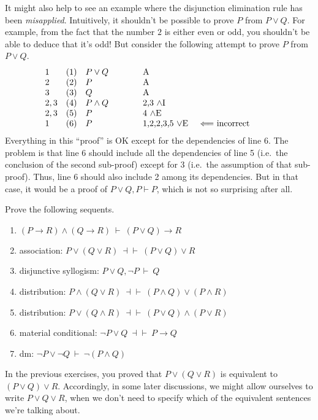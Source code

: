 It might also help to see an example where the disjunction elimination
rule has been {\it misapplied}.  Intuitively, it shouldn't be possible
to prove $P$ from $P\vee Q$.  For example, from the fact that the
number $2$ is either even or odd, you shouldn't be able to deduce that
it's odd!  But consider the following attempt to prove $P$ from
$P\vee Q$.
\[ \begin{array}{l l >{$}p{2cm}<{$} p{2cm} p{3cm}}
     1 & (1) & P\vee Q & A \\
     2 & (2) & P       & A \\
     3 & (3) & Q       & A \\
     2,3 & (4) & P\wedge Q & 2,3 $\wedge$I \\
     2,3 & (5) & P         & 4 $\wedge$E \\
     1   & (6) & P         & 1,2,2,3,5 $\vee$E & $\Longleftarrow$ incorrect \end{array} \]
Everything in this ``proof'' is OK except for the dependencies of line
6.  The problem is that line 6 should include all the dependencies of
line 5 (i.e.\ the conclusion of the second sub-proof) except for 3
(i.e.\ the assumption of that sub-proof).  Thus, line 6 should also
include 2 among its dependencies.  But in that case, it would be a
proof of $P\vee Q,P\vdash P$, which is not so surprising after all.

\begin{exercises} Prove the following sequents.
  \begin{enumerate}
  \item $(P\to R)\wedge (Q\to R)\:\vdash\: (P\vee Q)\to R$  
  \item association: $P\vee (Q\vee R)\:\dashv\vdash\: (P\vee Q)\vee R$
  \item disjunctive syllogism: $P\vee Q,\neg P\:\vdash \: Q$
\item distribution: $P\wedge (Q\vee R)\:\dashv\vdash\: (P\wedge Q)\vee (P\wedge R)$
\item distribution: $P\vee (Q\wedge R)\:\dashv\vdash\: (P\vee Q)\wedge (P\vee R)$
\item material conditional: $\neg P\vee Q\:\dashv\vdash\: P\to Q$
\item \gls{dm}: $\neg P\vee \neg Q\:\vdash\: \neg (P\wedge Q)$  
  \end{enumerate}
\end{exercises}

In the previous exercises, you proved that $P\vee (Q\vee R)$ is
equivalent to $(P\vee Q)\vee R$.  Accordingly, in some later
discussions, we might allow ourselves to write $P\vee Q\vee R$, when
we don't need to specify which of the equivalent sentences we're
talking about.

